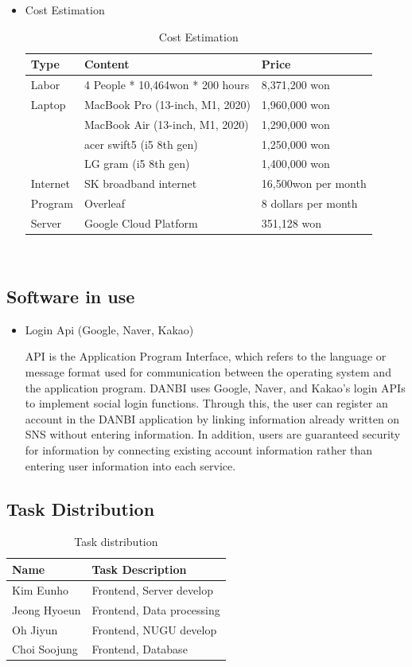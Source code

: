 \documentclass[conference]{IEEEtran}
\begin{document}
\begin{itemize}
    \item Cost Estimation
\begin{table}[h]
\centering
\caption{Cost Estimation}
\begin{tabular}[t]{p{0.8cm}p{3.4cm}p{2.5cm}}
\toprule
Type&Content&Price\\
\midrule
Labor&4 People * 10,464won * 200 hours&8,371,200 won\\
\rule{0in}{3ex}Laptop&MacBook Pro (13-inch, M1, 2020)&1,960,000 won\\
\rule{0in}{2ex}&MacBook Air (13-inch, M1, 2020)&1,290,000 won\\
\rule{0in}{2ex}&acer swift5 (i5 8th gen)&1,250,000 won\\
\rule{0in}{2ex}&LG gram (i5 8th gen)&1,400,000 won\\
\rule{0in}{3ex}Internet&SK broadband internet&16,500won per month\\
\rule{0in}{3ex}Program&Overleaf&8 dollars per month\\
\rule{0in}{3ex}Server&Google Cloud Platform&351,128 won\\
\bottomrule
\end{tabular}
\end{table}%
\end{itemize}
\ 
\subsection{Software in use}
\setlength{\parindent}{2ex}
\begin{itemize}
\setlength{\parindent}{2ex}
\setlength{\parskip}{0.5em}
\item Login Api (Google, Naver, Kakao)

API is the Application Program Interface, which refers to the language or message format used for communication between the operating system and the application program. DANBI uses Google, Naver, and Kakao's login APIs to implement social login functions. Through this, the user can register an account in the DANBI application by linking information already written on SNS without entering information. In addition, users are guaranteed security for information by connecting existing account information rather than entering user information into each service.   
\end{itemize}

\subsection{Task Distribution}
\begin{table}[h]
\centering
\caption{Task distribution}
\begin{tabular}[t]{ll}
\toprule
Name&Task Description\\
\midrule
Kim Eunho&Frontend, Server develop\\
Jeong Hyoeun&Frontend, Data processing\\
Oh Jiyun&Frontend, NUGU develop\\
Choi Soojung&Frontend, Database\\
\bottomrule
\end{tabular}
\end{table}%
\end{document}

